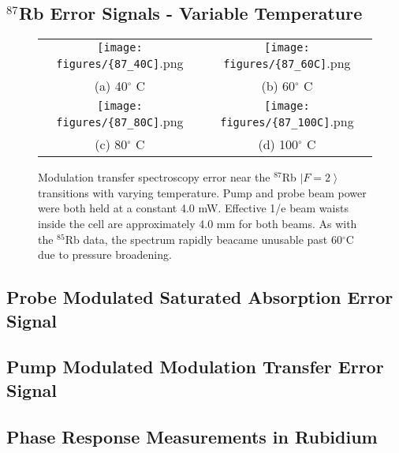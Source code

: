\subsection{$^{87}$Rb Error Signals - Variable Temperature}
\label{app:87temp}

\begin{figure}[H]
  \begin{tabular}{cc}
    \texttt{[image: figures/\{87\_40C]}.png} &
    \texttt{[image: figures/\{87\_60C]}.png} \\
    (a) 40$^{\circ}$ C & (b) 60$^{\circ}$ C  \\[6pt]
    \texttt{[image: figures/\{87\_80C]}.png} &
    \texttt{[image: figures/\{87\_100C]}.png} \\
    (c) 80$^{\circ}$ C  & (d) 100$^{\circ}$ C  \\[6pt]
  \end{tabular}
  \caption{Modulation transfer spectroscopy error near the $^{87}$Rb $\left|F=2\right\rangle$ transitions with varying temperature. Pump and probe beam power were both held at a constant 4.0 mW. Effective 1/e beam waists inside the cell are approximately 4.0 mm for both beams. As with the $^{85}$Rb data, the spectrum rapidly beacame unusable past 60$^{\circ}$C due to pressure broadening.}
\end{figure}
\newpage

\subsection{Probe Modulated Saturated Absorption Error Signal}

\subsection{Pump Modulated Modulation Transfer Error Signal}

\subsection{Phase Response Measurements in Rubidium}